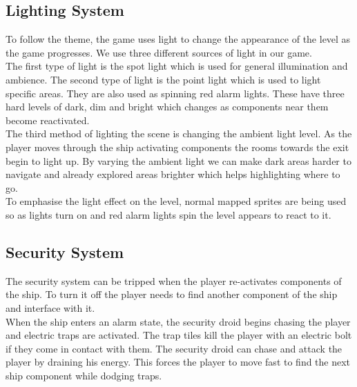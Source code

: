 \documentclass[11pt]{article}
\begin{document}
\subsection{Lighting System}
To follow the theme, the game uses light to change the appearance of the level as the game progresses. We use three different sources of light in our game.\\

The first type of light is the spot light which is used for general illumination and ambience. The second type of light is the point light which is used to light specific areas. They are also used as spinning red alarm lights. These have three hard levels of dark, dim and bright which changes as components near them become reactivated.\\

The third method of lighting the scene is changing the ambient light level. As the player moves through the ship activating components the rooms towards the exit begin to light up. By varying the ambient light we can make dark areas harder to navigate and already explored areas brighter which helps highlighting where to go. \\

To emphasise the light effect on the level, normal mapped sprites are being used so as lights turn on and red alarm lights spin the level appears to react to it.
\subsection{Security System}

The security system can be tripped when the player re-activates components of the ship. To turn it off the player needs to find another component of the ship and interface with it.\\

 When the ship enters an alarm state, the security droid begins chasing the player and electric traps are activated. The trap tiles kill the player with an electric bolt if they come in contact with them. The security droid can chase and attack the player by draining his energy. This forces the player to move fast to find the next ship component while dodging traps.
\end{document}
